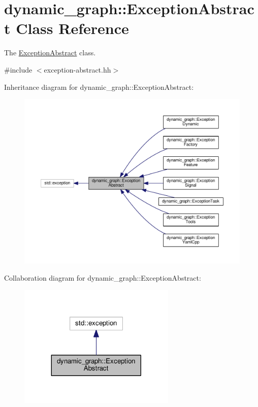\hypertarget{classdynamic__graph_1_1ExceptionAbstract}{}\section{dynamic\+\_\+graph\+:\+:Exception\+Abstract Class Reference}
\label{classdynamic__graph_1_1ExceptionAbstract}


The \hyperlink{classdynamic__graph_1_1ExceptionAbstract}{Exception\+Abstract} class.  




{\ttfamily \#include $<$exception-\/abstract.\+hh$>$}



Inheritance diagram for dynamic\+\_\+graph\+:\+:Exception\+Abstract\+:\nopagebreak
\begin{figure}[H]
\begin{center}
\leavevmode
\includegraphics[width=350pt]{classdynamic__graph_1_1ExceptionAbstract__inherit__graph}
\end{center}
\end{figure}


Collaboration diagram for dynamic\+\_\+graph\+:\+:Exception\+Abstract\+:\nopagebreak
\begin{figure}[H]
\begin{center}
\leavevmode
\includegraphics[width=212pt]{classdynamic__graph_1_1ExceptionAbstract__coll__graph}
\end{center}
\end{figure}
